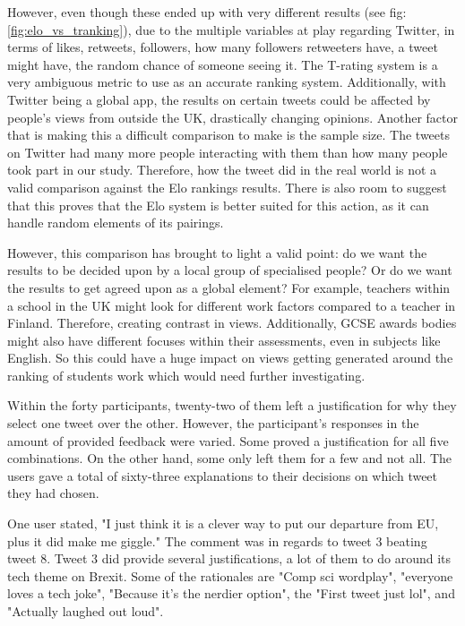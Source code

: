 	However, even though these ended up with very different results (see fig: \ref{fig:elo_vs_tranking}), due to the multiple variables at play regarding Twitter, in terms of likes, retweets, followers, how many followers retweeters have, a tweet might have, the random chance of someone seeing it. The T-rating system is a very ambiguous metric to use as an accurate ranking system. Additionally, with Twitter being a global app, the results on certain tweets could be affected by people's views from outside the UK, drastically changing opinions. Another factor that is making this a difficult comparison to make is the sample size. The tweets on Twitter had many more people interacting with them than how many people took part in our study. Therefore, how the tweet did in the real world is not a valid comparison against the Elo rankings results. There is also room to suggest that this proves that the Elo system is better suited for this action, as it can handle random elements of its pairings. 
	
	However, this comparison has brought to light a valid point: do we want the results to be decided upon by a local group of specialised people? Or do we want the results to get agreed upon as a global element? For example, teachers within a school in the UK might look for different work factors compared to a teacher in Finland. Therefore, creating contrast in views. Additionally, GCSE awards bodies might also have different focuses within their assessments, even in subjects like English. So this could have a huge impact on views getting generated around the ranking of students work which would need further investigating.

	Within the forty participants, twenty-two of them left a justification for why they select one tweet over the other. However, the participant's responses in the amount of provided feedback were varied. Some proved a justification for all five combinations. On the other hand, some only left them for a few and not all. The users gave a total of sixty-three explanations to their decisions on which tweet they had chosen.
	
	One user stated, "I just think it is a clever way to put our departure from EU, plus it did make me giggle." The comment was in regards to tweet 3 beating tweet 8. Tweet 3 did provide several justifications, a lot of them to do around its tech theme on Brexit. Some of the rationales are "Comp sci wordplay", "everyone loves a tech joke", "Because it's the nerdier option", the "First tweet just lol", and "Actually laughed out loud".
	
